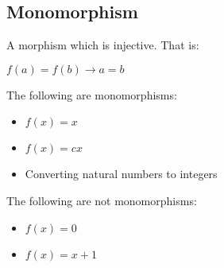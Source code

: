 
\subsection{Monomorphism}

A morphism which is injective. That is:

\(f(a)=f(b)\rightarrow a=b\)

The following are monomorphisms:

\begin{itemize}
\item \(f(x)=x\)
\item \(f(x)=cx\)
\item Converting natural numbers to integers
\end{itemize}

The following are not monomorphisms:

\begin{itemize}
\item \(f(x)=0\)
\item \(f(x)=x+1\)
\end{itemize}

